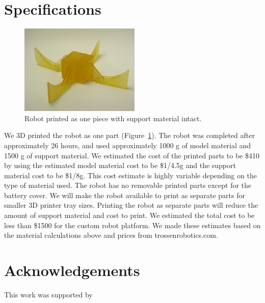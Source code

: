 \documentclass[letterpaper]{article}
\begin{document}
\section{Specifications}
\begin{figure}[t]
\begin{center}
\includegraphics[width=2.25in,angle=0]{fig2.jpg}
\caption{Robot printed as one piece with support material intact.}
\label{fig2}
\end{center}
\end{figure}
We 3D printed the robot as one part (Figure~\ref{fig2}). The robot was completed after approximately 26 hours, and used approximately 1000 g of model material and 1500 g of support material. We estimated the cost of the printed parts to be \$410 by using the estimated model material cost to be \$1/4.5g and the support material cost to be \$1/8g. This cost estimate is highly variable depending on the type of material used. The robot has no removable printed parts except for the battery cover. We will make the robot available to print as separate parts for smaller 3D printer tray sizes. Printing the robot as separate parts will reduce the amount of support material and cost to print. We estimated the total cost to be less than \$1500 for the custom robot platform. We made these estimates based on the material calculations above and prices from trossenrobotics.com.

\begin{table}[h]
\vskip 0.25cm
\caption{Estimated total cost. A specifiic parts list is on our website \citep{WEB}}
\end{table}

\section{Acknowledgements}
This work was supported by

\footnotesize


\end{document}
